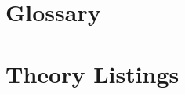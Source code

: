 \appendix

\vfill

\section{Glossary}




\section{Theory Listings}
{
\let\Section\subsection
\let\Subsection\subsubsection
\def\subsection#1{\Subsection*{#1}}
\def\section#1{\Section{#1}\label{ariscat}}

\def\section#1{\Section{#1}\label{syllog1}}

\def\section#1{\Section{#1}\label{syllog2}}

\def\section#1{\Section{#1}\label{syllog2}}

\def\section#1{\Section{#1}\label{modsyllog}}

\def\section#1{\Section{#1}\label{syllmetap}}

\def\section#1{\Section{#1}\label{gccon}}


}  %

